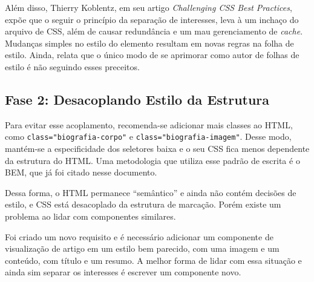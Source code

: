 Além disso, Thierry Koblentz, em seu artigo \emph{Challenging CSS Best
Practices}, expõe que o seguir o princípio da separação de interesses,
leva à um inchaço do arquivo de CSS, além de causar redundância e um mau
gerenciamento de \emph{cache}. Mudanças simples no estilo do elemento
resultam em novas regras na folha de estilo. Ainda, relata que o único
modo de se aprimorar como autor de folhas de estilo é não seguindo esses
preceitos.

\hypertarget{fase-2-desacoplando-estilo-da-estrutura}{%
\subsection{Fase 2: Desacoplando Estilo da
Estrutura}\label{fase-2-desacoplando-estilo-da-estrutura}}

Para evitar esse acoplamento, recomenda-se adicionar mais classes ao
HTML, como \texttt{class="biografia-corpo"} e
\texttt{class="biografia-imagem"}. Desse modo, mantém-se a
especificidade dos seletores baixa e o seu CSS fica menos dependente da
estrutura do HTML. Uma metodologia que utiliza esse padrão de escrita é
o BEM, que já foi citado nesse documento.

\begin{Shaded}
\begin{Highlighting}[]
\KeywordTok{>} 
    \KeywordTok{>} 
\StringTok{        }\ErrorTok{<}\KeywordTok{>} 
        \KeywordTok{>} 
\end{Highlighting}
\end{Shaded}

Dessa forma, o HTML permanece ``semântico'' e ainda não contém decisões
de estilo, e CSS está desacoplado da estrutura de marcação. Porém existe
um problema ao lidar com componentes similares.

Foi criado um novo requisito e é necessário adicionar um componente de
visualização de artigo em um estilo bem parecido, com uma imagem e um
conteúdo, com título e um resumo. A melhor forma de lidar com essa
situação e ainda sim separar os interesses é escrever um componente
novo.

